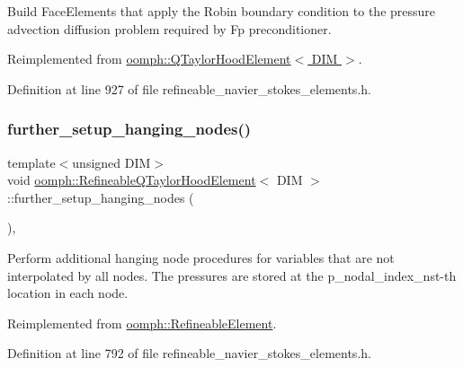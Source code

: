 Build Face\+Elements that apply the Robin boundary condition to the pressure advection diffusion problem required by Fp preconditioner. 



Reimplemented from \hyperlink{classoomph_1_1QTaylorHoodElement_aa3c4eabbedadb47c3bcbbbe22febf3cf}{oomph\+::\+Q\+Taylor\+Hood\+Element$<$ D\+I\+M $>$}.



Definition at line 927 of file refineable\+\_\+navier\+\_\+stokes\+\_\+elements.\+h.

\mbox{\label{classoomph_1_1RefineableQTaylorHoodElement_a66ac39b667333878e334998ed9b28000}} 
\subsubsection{\texorpdfstring{further\+\_\+setup\+\_\+hanging\+\_\+nodes()}{further\_setup\_hanging\_nodes()}}
{\footnotesize\ttfamily template$<$unsigned D\+IM$>$ \\
void \hyperlink{classoomph_1_1RefineableQTaylorHoodElement}{oomph\+::\+Refineable\+Q\+Taylor\+Hood\+Element}$<$ D\+IM $>$\+::further\+\_\+setup\+\_\+hanging\+\_\+nodes (\begin{DoxyParamCaption}{ }\end{DoxyParamCaption})\hspace{0.3cm}{\ttfamily [inline]}, {\ttfamily [virtual]}}



Perform additional hanging node procedures for variables that are not interpolated by all nodes. The pressures are stored at the p\+\_\+nodal\+\_\+index\+\_\+nst-\/th location in each node. 



Reimplemented from \hyperlink{classoomph_1_1RefineableElement_a86ea01c485f7ff822dce74b884312ccb}{oomph\+::\+Refineable\+Element}.



Definition at line 792 of file refineable\+\_\+navier\+\_\+stokes\+\_\+elements.\+h.

